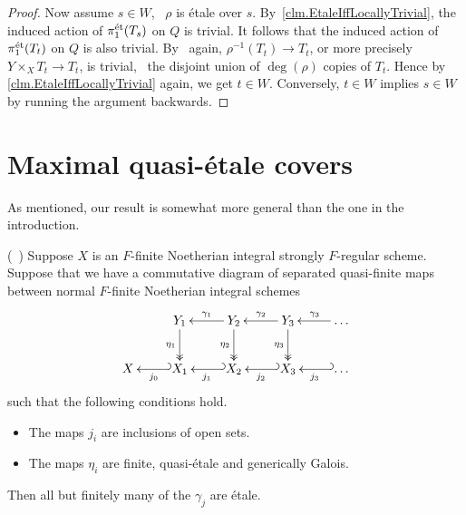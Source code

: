 \documentclass[12pt]{amsart}
\numberwithin{equation}{theorem}
\renewcommand{\:}{\colon}
\newcommand{\piet}{\pi_1^{\textnormal{\'{e}t}}} %
\theoremstyle{theorem}
\renewcommand{\O}{\mathscr O}
\begin{document}
\begin{proof}
Now assume $s \in W$, \ie~$\rho$ is \'etale over $s$.
By~\autoref{clm.EtaleIffLocallyTrivial},
the induced action of $\piet(T_s)$ on $Q$ is trivial.
It follows that the induced action of $\piet(T_t)$ on $Q$ is also trivial.
By~\cite[Chapter I, Theorem 5.3]{MilneEtaleCohomology} again, $\rho^{-1}(T_t) \to T_t$, or more precisely $Y \times_X T_t \to T_t$, is trivial, \ie~the disjoint union of $\deg(\rho)$ copies of $T_t$.
Hence by \autoref{clm.EtaleIffLocallyTrivial} again, we get $t \in W$.
Conversely, $t \in W$ implies $s \in W$ by running the argument backwards.
\end{proof}

\section{Maximal quasi-\'etale covers}

As mentioned, our result is somewhat more general than the one in the introduction.

\begin{theorem}\textnormal{(\cf~\cite[Theorem 2.1]{GrebKebekusPeternellEtaleFundamental})} \label{thm.QuasiEtaleStabilize}
Suppose $X$ is an $F$-finite Noetherian integral strongly $F$-regular scheme.
Suppose that we have a commutative diagram of separated quasi-finite maps between normal $F$-finite Noetherian integral schemes
\[
\xymatrix{
    &              Y_1 \ar@{->>}[d]_{\eta_1}  & \ar[l]_{\gamma_1} Y_2 \ar@{->>}[d]_{\eta_2} & \ar[l]_{\gamma_2} Y_3 \ar@{->>}[d]_{\eta_3} & \ar[l]_{\gamma_3} \ldots\\
X   & \ar@{_{(}->}[l]^{j_0}   X_1                  & \ar@{_{(}->}[l]^{j_1}      X_2                 & \ar@{_{(}->}[l]^{j_2}      X_3                 & \ar@{_{(}->}[l]^{j_3} \ldots
}
\]
such that the following conditions hold.
\begin{itemize}
\item[(i)] The maps $j_i$ are inclusions of open sets.
\item[(ii)] The maps $\eta_i$ are finite, quasi-\'etale and generically Galois.
\end{itemize}
Then all but finitely many of the $\gamma_j$ are \'etale.
\end{theorem}
\end{document}

